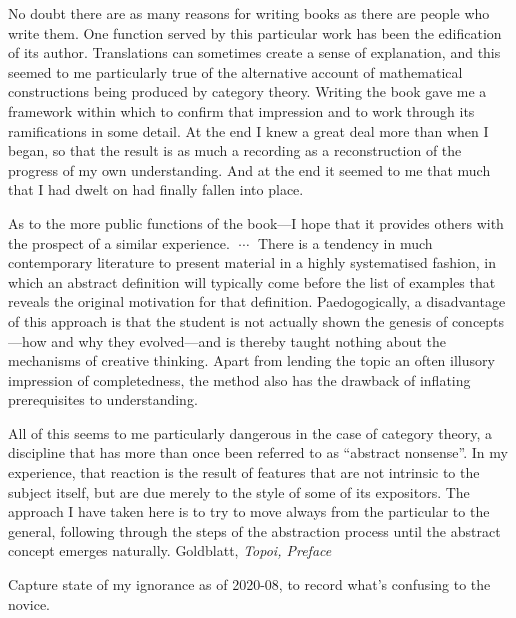 \documentclass[11pt,openany]{book}
\begin{document}
\begin{boxquote}
No doubt there are as many reasons for writing books as there are people
who write them. One function served by this particular work has been the
edification of its author. Translations can sometimes create a sense of
explanation, and this seemed to me particularly true of the alternative
account of mathematical constructions being produced by category
theory. Writing the book gave me a framework within which to confirm
that impression and to work through its ramifications in some detail. At
the end I knew a great deal more than when I began, so that the result is
as much a recording as a reconstruction of the progress of my own
understanding. And at the end it seemed to me that much that I had
dwelt on had finally fallen into place.
\par
As to the more public functions of the book---I hope that it provides
others with the prospect of a similar experience. 
$\;\cdots\;$ 
There is a tendency in much contemporary literature to present material
in a highly systematised fashion, in which an abstract definition will
typically come before the list of examples that reveals the original
motivation for that definition. Paedogogically, a disadvantage of this
approach is that the student is not actually shown the genesis of 
concepts---how and why they evolved---and 
is thereby taught nothing about the
mechanisms of creative thinking. Apart from lending the topic an often
illusory impression of completedness, the method also has the drawback
of inflating prerequisites to understanding.
\par
All of this seems to me particularly dangerous in the case of category
theory, a discipline that has more than once been referred to as ``abstract
nonsense''. In my experience, that reaction is the result of features that
are not intrinsic to the subject itself, but are due merely to the style of
some of its expositors. The approach I have taken here is to try to move
always from the particular to the general, following through the steps of
the abstraction process until the abstract concept emerges naturally. 
\tcblower
{Goldblatt, \emph{Topoi, Preface}~\cite{Goldblatt:1984:Topoi}}
\end{boxquote}
Capture state of my ignorance as of 2020-08,
to record what's confusing to the novice.
\end{document}
